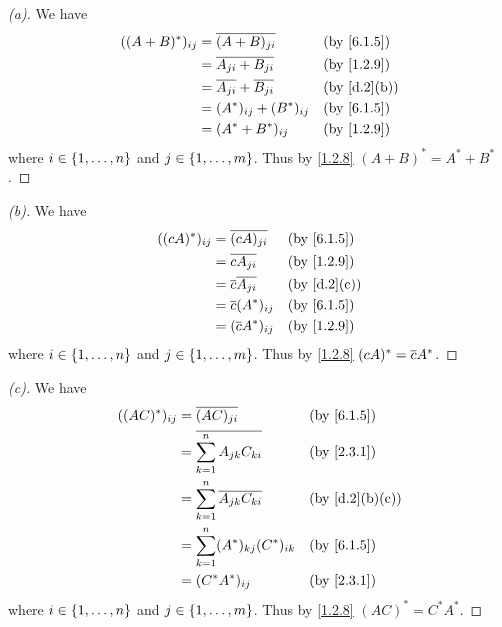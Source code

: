 \begin{proof}[(a)]
  We have
  \begin{align*}
    ((A + B)^*)_{i j} & = \conj{(A + B)_{j i}}            &  & \by{6.1.5}  \\
                      & = \conj{A_{j i} + B_{j i}}        &  & \by{1.2.9}  \\
                      & = \conj{A_{j i}} + \conj{B_{j i}} &  & \by{d.2}[b] \\
                      & = (A^*)_{i j} + (B^*)_{i j}       &  & \by{6.1.5}  \\
                      & = (A^* + B^*)_{i j}               &  & \by{1.2.9}
  \end{align*}
  where \(i \in \left\lbrace1, \dots, n\right\rbrace\) and \(j \in \left\lbrace1, \dots, m\right\rbrace\).
  Thus by \cref{1.2.8} \((A + B)^* = A^* + B^*\).
\end{proof}

\begin{proof}[(b)]
  We have
  \begin{align*}
    ((cA)^*)_{i j} & = \conj{(cA)_{j i}}       &  & \by{6.1.5}  \\
                   & = \conj{c A_{j i}}        &  & \by{1.2.9}  \\
                   & = \conj{c} \conj{A_{j i}} &  & \by{d.2}[c] \\
                   & = \conj{c} (A^*)_{i j}    &  & \by{6.1.5}  \\
                   & = (\conj{c} A^*)_{i j}    &  & \by{1.2.9}
  \end{align*}
  where \(i \in \left\lbrace1, \dots, n\right\rbrace\) and \(j \in \left\lbrace1, \dots, m\right\rbrace\).
  Thus by \cref{1.2.8} \((cA)^* = \overline{c} A^*\).
\end{proof}

\begin{proof}[(c)]
  We have
  \begin{align*}
    ((AC)^*)_{i j} & = \conj{(AC)_{j i}}                            &  & \by{6.1.5}    \\
                   & = \conj{\sum_{k = 1}^n A_{j k} C_{k i}}        &  & \by{2.3.1}    \\
                   & = \sum_{k = 1}^n \conj{A_{j k}} \conj{C_{k i}} &  & \by{d.2}[b,c] \\
                   & = \sum_{k = 1}^n (A^*)_{k j} (C^*)_{i k}       &  & \by{6.1.5}    \\
                   & = (C^* A^*)_{i j}                              &  & \by{2.3.1}
  \end{align*}
  where \(i \in \left\lbrace1, \dots, n\right\rbrace\) and \(j \in \left\lbrace1, \dots, m\right\rbrace\).
  Thus by \cref{1.2.8} \((AC)^* = C^* A^*\).
\end{proof}

